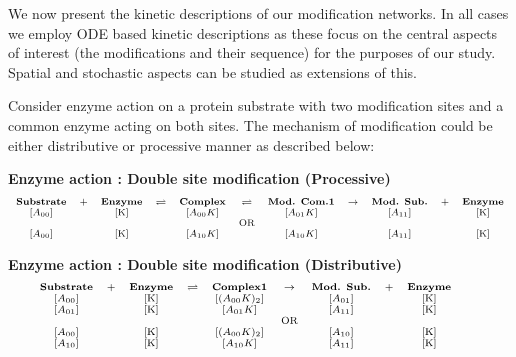 \documentclass[9pt,lineno]{elife}
\begin{document}
\begin{appendixbox}
We now present the kinetic descriptions of our modification networks. In all cases we employ ODE based kinetic descriptions as these focus on the central aspects of interest (the modifications and their sequence) for the purposes of our study. Spatial and stochastic aspects can be studied as extensions of this.

 Consider enzyme action on a protein substrate with two modification sites and a common enzyme acting on both sites.
 The mechanism of modification could  be either  distributive or processive manner as described below: 

\textbf{Enzyme action : Double site modification (Processive)}
\begin{equation*}
\scriptsize	{    \begin{array}{c c c c c c c c c c c}
        \textrm{\textbf{Substrate}}  &+  &\textrm{\textbf{Enzyme}}  &\rightleftharpoons  &\textrm{\textbf{Complex}}  &\rightleftharpoons  &\textrm{\textbf{Mod. Com.1}}  &\rightarrow  &\textrm{\textbf{Mod. Sub.}}  &+ &\textrm{\textbf{Enzyme}} \\
        \textrm{[$A_{00}$]} & & \textrm{[K]} & & \textrm{[$A_{00}K$]} & &\textrm{[$A_{01}K$]} & &\textrm{[$A_{11}$]} & &\textrm{[K]} \\
        & & & & & \textrm{OR} & & & & & \\
        \textrm{[$A_{00}$]} & & \textrm{[K]} & & \textrm{[$A_{10}K$]} & &\textrm{[$A_{10}K$]} & &\textrm{[$A_{11}$]} & &\textrm{[K]} \\
    \end{array} }
\end{equation*}

\textbf{Enzyme action : Double site modification (Distributive)}
\begin{equation*}
\scriptsize	{    \begin{array}{c c c c c c c c c c c}
        \textrm{\textbf{Substrate}}  &+  &\textrm{\textbf{Enzyme}}  &\rightleftharpoons  &\textrm{\textbf{Complex1}}  &\rightarrow  &\textrm{\textbf{Mod. Sub.}} &+ &\textrm{\textbf{Enzyme}} \\
        \textrm{[$A_{00}$]} & & \textrm{[K]} & & \textrm{[$(A_{00}K)_2$]} &  &\textrm{[$A_{01}$]} & &\textrm{[K]} \\
        \textrm{[$A_{01}$]} & & \textrm{[K]} & & \textrm{[$A_{01}K$]} &  &\textrm{[$A_{11}$]} & &\textrm{[K]} \\
        & & & & & \textrm{OR} & & & & & \\
        \textrm{[$A_{00}$]} & & \textrm{[K]} & & \textrm{[$(A_{00}K)_2$]} &  &\textrm{[$A_{10}$]} & &\textrm{[K]} \\
        \textrm{[$A_{10}$]} & & \textrm{[K]} & & \textrm{[$A_{10}K$]} &  &\textrm{[$A_{11}$]} & &\textrm{[K]} \\
    \end{array} }
\end{equation*}


\end{appendixbox}
\end{document}
